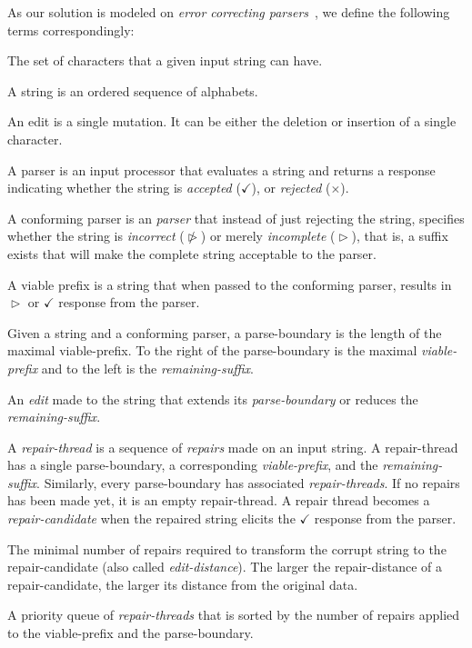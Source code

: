 \documentclass[acmsmall,screen,review,anonymous]{acmart}
\def\Rincomplete{\texttt{\color{incompletecolor}\textbf{$\vartriangleright$}}\xspace}
\def\Rincorrect{\texttt{\color{incorrectcolor}\textbf{$\ntriangleright$}}\xspace}
\def\Rvalid{\texttt{\color{validcolor}\textbf{$\checkmark$}}\xspace}
\def\Rreject{\texttt{\color{validcolor}\textbf{$\times$}}\xspace}
\begin{document}
As our solution is modeled on \emph{error correcting parsers}~\cite{aho1972minimum},
we define the following terms correspondingly:
\begin{description}[labelwidth=!, labelindent=0pt]
\item[alphabet] The set of characters that a given input string can have.

\item[string] A string is an ordered sequence of alphabets.

\item[edit] An edit is a single mutation. It can be either the deletion
or insertion of a single character.

\item[parser] A parser is an input processor that evaluates a string and returns
a response indicating whether the string is \emph{accepted} (\Rvalid), or \emph{rejected} (\Rreject).

\item[conforming parser] A conforming parser is an \emph{parser} that 
instead of just rejecting the string, specifies whether
    the string is \emph{incorrect} (\Rincorrect) or merely \emph{incomplete} (\Rincomplete), that is, a suffix exists that
will make the complete string acceptable to the parser.

\item[viable-prefix] A viable prefix is a string that when passed to the conforming parser,
 results in \Rincomplete or \Rvalid response from the parser.

\item[parse-boundary] Given a string and a conforming parser, a parse-boundary is the
length of the maximal viable-prefix. To the right of the parse-boundary is the maximal
\emph{viable-prefix} and to the left is the \emph{remaining-suffix}.

\item[repair] An \emph{edit} made to the string that extends its \emph{parse-boundary}
  or reduces the \emph{remaining-suffix}.

\item[repair-thread] A \emph{repair-thread} is a sequence of \emph{repairs} made on an
input string. A repair-thread has a single parse-boundary, a corresponding
\emph{viable-prefix}, and the \emph{remaining-suffix}.
Similarly, every parse-boundary has associated \emph{repair-threads}.
If no repairs has been made yet, it is an empty repair-thread.
A repair thread becomes a \emph{repair-candidate} when the repaired string
elicits the \Rvalid response from the parser.

\item[repair-distance] The minimal number of repairs required to transform the corrupt
string to the repair-candidate (also called \emph{edit-distance}). The larger the
repair-distance of a repair-candidate, the larger its distance from the original data.

\item[thread-queue] A priority queue of \emph{repair-threads} that is sorted by the
number of repairs applied to the viable-prefix and the parse-boundary.
\end{description}
\end{document}
